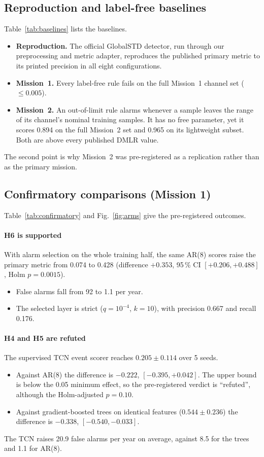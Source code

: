 \documentclass[preprint,12pt,authoryear]{elsarticle}
\begin{document}
\subsection{Reproduction and label-free baselines}
Table~\ref{tab:baselines} lists the baselines.
\begin{itemize}
\item \textbf{Reproduction.} The official GlobalSTD detector, run through our preprocessing
  and metric adapter, reproduces the published primary metric to its printed precision in
  all eight configurations.
\item \textbf{Mission~1.} Every label-free rule fails on the full Mission~1 channel set
  ($\le0.005$).
\item \textbf{Mission~2.} An out-of-limit rule alarms whenever a sample leaves the range of
  its channel's nominal training samples. It has no free parameter, yet it scores 0.894 on
  the full Mission~2 set and 0.965 on its lightweight subset. Both are above every
  published DMLR value.
\end{itemize}
The second point is why Mission~2 was pre-registered as a replication rather than as the
primary mission.

\subsection{Confirmatory comparisons (Mission 1)}
Table~\ref{tab:confirmatory} and Fig.~\ref{fig:arms} give the pre-registered outcomes.

\paragraph{H6 is supported}
With alarm selection on the whole training half, the same AR(8) scores raise the primary
metric from 0.074 to 0.428 (difference $+0.353$, 95\,\% CI $[+0.206,+0.488]$, Holm
$p=0.0015$).
\begin{itemize}
\item False alarms fall from 92 to 1.1 per year.
\item The selected layer is strict ($q=10^{-4}$, $k=10$), with precision 0.667 and recall
  0.176.
\end{itemize}

\paragraph{H4 and H5 are refuted}
The supervised TCN event scorer reaches $0.205\pm0.114$ over 5 seeds.
\begin{itemize}
\item Against AR(8) the difference is $-0.222$, $[-0.395,+0.042]$. The upper bound is below
  the 0.05 minimum effect, so the pre-registered verdict is ``refuted'', although the
  Holm-adjusted $p=0.10$.
\item Against gradient-boosted trees on identical features ($0.544\pm0.236$) the difference
  is $-0.338$, $[-0.540,-0.033]$.
\end{itemize}
The TCN raises 20.9 false alarms per year on average, against 8.5 for the trees and 1.1 for
AR(8).
\end{document}
